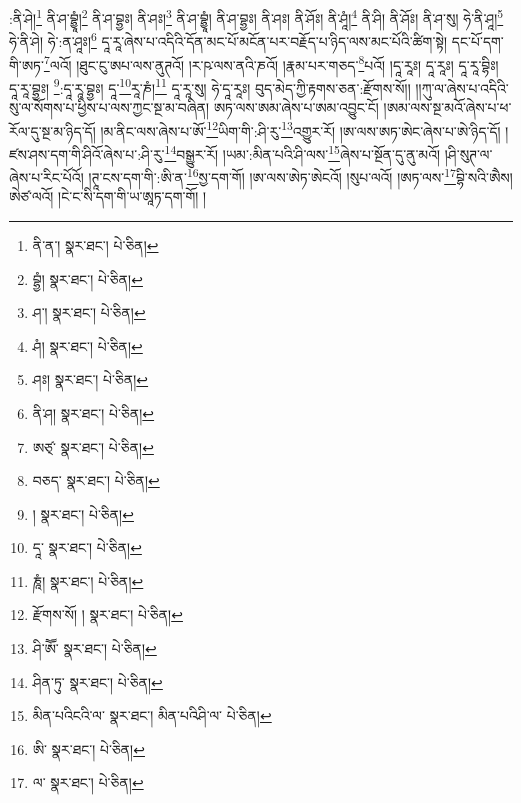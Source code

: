 :ནི་ཤེ།\footnote{ནི་ན་།  སྣར་ཐང་།  པེ་ཅིན། } ནི་ཤ་བྷྱཱཾ།\footnote{བྷྱཾ།  སྣར་ཐང་།  པེ་ཅིན། } ནི་ཤ་བྷྱཿ། ནི་ཤཿ།\footnote{ཤ་།  སྣར་ཐང་།  པེ་ཅིན། } ནི་ཤ་བྷྱཱཾ། ནི་ཤ་བྷྱཿ། ནི་ཤཿ། ནི་ཤོཿ། ནི་ཤཱཾ།\footnote{ཤཾ།  སྣར་ཐང་།  པེ་ཅིན། } ནི་ཤི། ནི་ཤོཿ། ནི་ཤ་སུ། ཧེ་ནི་ཤཱ།\footnote{ཤཿ།  སྣར་ཐང་།  པེ་ཅིན། } ཧེ་ནི་ཤེ། ཧེ་:ན་ཤཱཿ།\footnote{ནི་ཤ།  སྣར་ཐང་།  པེ་ཅིན། } དཱ་རཱ་ཞེས་པ་འདིའི་དོན་མང་པོ་མངོན་པར་བརྗོད་པ་ཉིད་ལས་མང་པོའི་ཚིག་སྟེ། དང་པོ་དག་གི་ཨཏ་\footnote{ཨཙ྄་  སྣར་ཐང་།  པེ་ཅིན། }ལའོ། །ཐུང་ངུ་ཨཔ་ལས་ནུཊའོ། །ར་ཥ་ལས་ནའི་ཎའོ། །རྣམ་པར་གཅད་\footnote{བཅད་  སྣར་ཐང་།  པེ་ཅིན། }པའོ། །དཱ་རཱཿ། དཱ་རཱཿ། དཱ་རཱ་བྷིཿ། དཱ་རཱ་བྷྱཿ། \footnote{།    སྣར་ཐང་།  པེ་ཅིན། }:དཱ་རཱ་བྷྱཿ། དཱ་\footnote{དཱ་  སྣར་ཐང་།  པེ་ཅིན། }རཱ་ཎཾ།\footnote{ཎཱཾ།  སྣར་ཐང་།  པེ་ཅིན། } དཱ་རཱ་སུ། ཧེ་དཱ་རཱཿ། བུད་མེད་ཀྱི་རྟགས་ཅན་:རྫོགས་སོ།། །།ཀུ་ལ་ཞེས་པ་འདིའི་སུ་ལ་སོགས་པ་ཕྱིས་པ་ལས་ཀྱང་སྔ་མ་བཞིན། ཨཏ་ལས་ཨམ་ཞེས་པ་ཨམ་འབྱུང་ངོ། །ཨམ་ལས་སྔ་མའོ་ཞེས་པ་ཕ་རོལ་དུ་སྔ་མ་ཉིད་དོ། །མ་ནིང་ལས་ཞེས་པ་ཨོ་\footnote{རྫོགས་སོ། །  སྣར་ཐང་།  པེ་ཅིན། }ཡིག་གི་:ཤི་རུ་\footnote{ཤི་ཨཽ་  སྣར་ཐང་།  པེ་ཅིན། }འགྱུར་རོ། །ཨ་ལས་ཨཏ་ཨེང་ཞེས་པ་ཨེ་ཉིད་དོ། །ཛས་ཤས་དག་གི་ཤིའོ་ཞེས་པ་:ཤི་རུ་\footnote{ཤིན་ཏུ་  སྣར་ཐང་།  པེ་ཅིན། }བསྒྱུར་རོ། །ཡམ་:མིན་པའི་ཤི་ལས་\footnote{མིན་པའིངའི་ལ་  སྣར་ཐང་། མིན་པའིཤི་ལ་  པེ་ཅིན། }ཞེས་པ་སྔོན་དུ་ནུ་མའོ། །ཤི་སུཊ་ལ་ཞེས་པ་རིང་པོའོ། །ཊཱ་ངས་དག་གི་:ཨི་ན་\footnote{ཨི་  སྣར་ཐང་།  པེ་ཅིན། }སྱ་དག་གོ། །ཨ་ལས་ཨེཏ་ཨེངའོ། །སུཔ་ལའོ། །ཨཏ་ལས་\footnote{ལ་  སྣར་ཐང་།  པེ་ཅིན། }བྷི་སའི་ཨཻས། ཨེཙ་ལའོ། །ངེ་ང་སི་དག་གི་ཡ་ཨཱཏ་དག་གོ། །

